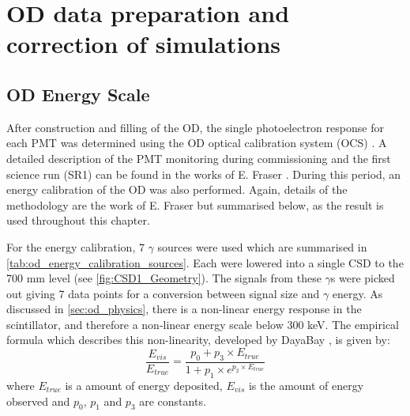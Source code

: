 \section{OD data preparation and correction of simulations}

\subsection{OD Energy Scale} \label{sec:od_energy_scale}
\par
After construction and filling of the OD, the single photoelectron response for each PMT was determined using the OD optical calibration system (OCS) \cite{lz_ocs_system_ref}.
A detailed description of the PMT monitoring during commissioning and the first science run (SR1) can be found in the works of E. Fraser \cite{ewanfraser_thesis_ref}. 
During this period, an energy calibration of the OD was also performed.
Again, details of the methodology are the work of E. Fraser \cite{ewanfraser_thesis_ref} but summarised below, as the result is used throughout this chapter.
\par
For the energy calibration, 7 $\gamma$ sources were used which are summarised in \autoref{tab:od_energy_calibration_sources}.
Each were lowered into a single CSD to the 700 mm level (see \autoref{fig:CSD1_Geometry}).
The signals from these $\gamma$s were picked out giving 7 data points for a conversion between signal size and $\gamma$ energy.
As discussed in \autoref{sec:od_physics}, there is a non-linear energy response in the scintillator, and therefore a non-linear energy scale below 300 keV.
The empirical formula which describes this non-linearity, developed by DayaBay \cite{dayabay_antineutrino_oscillation_ref, ls_nonlinear_energy_response_ref}, is given by:
\begin{equation}
    \frac{E_{vis}}{E_{true}} = \frac{p_0  + p_3 \times E_{true}}{1 + p_1 \times e^{p_2 \times E_{true}}}
    \label{eq:ls_light_response}
\end{equation}
where $E_{true}$ is a amount of energy deposited, $E_{vis}$ is the amount of energy observed and $p_0$, $p_1$ and $p_3$ are constants.

